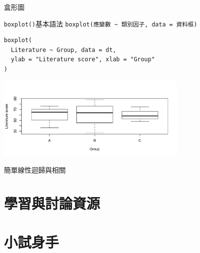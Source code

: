 \documentclass[12pt]{beamer}
\begin{document}
\begin{frame}[fragile]{盒形圖}

\begin{block}{\texttt{boxplot()}基本語法}
\verb+boxplot(應變數 ~ 類別因子, data = 資料框)+
\end{block}

\begin{verbatim}
boxplot(
  Literature ~ Group, data = dt, 
  ylab = "Literature score", xlab = "Group"
)
\end{verbatim}

\begin{center}
\includegraphics[width=0.7\textwidth]{Rplot-three-group.pdf}
\end{center}
\end{frame}

\begin{frame}[fragile]{簡單線性迴歸與相關}
\end{frame}





\section{學習與討論資源}\subsection{}

\section{小試身手}\subsection{}
\end{document}
